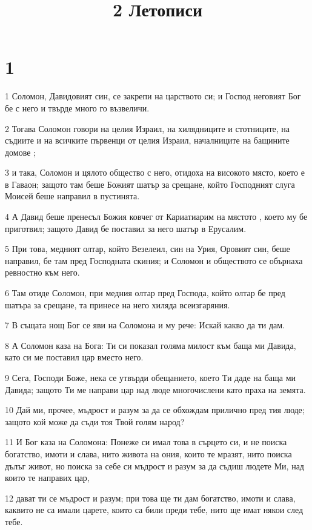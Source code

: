

\title{2 Летописи}


\chapter{1}

\par 1 Соломон, Давидовият син, се закрепи на царството си; и Господ неговият Бог бе с него и твърде много го възвеличи.
\par 2 Тогава Соломон говори на целия Израил, на хилядниците и стотниците, на съдиите и на всичките първенци от целия Израил, началниците на бащините домове ;
\par 3 и така, Соломон и цялото общество с него, отидоха на високото място, което е в Гаваон; защото там беше Божият шатър за срещане, който Господният слуга Моисей беше направил в пустинята.
\par 4 А Давид беше пренесъл Божия ковчег от Кариатиарим на мястото , което му бе приготвил; защото Давид бе поставил за него шатър в Ерусалим.
\par 5 При това, медният олтар, който Везелеил, син на Урия, Оровият син, беше направил, бе там пред Господната скиния; и Соломон и обществото се обърнаха ревностно към него.
\par 6 Там отиде Соломон, при медния олтар пред Господа, който олтар бе пред шатъра за срещане, та принесе на него хиляда всеизгаряния.
\par 7 В същата нощ Бог се яви на Соломона и му рече: Искай какво да ти дам.
\par 8 А Соломон каза на Бога: Ти си показал голяма милост към баща ми Давида, като си ме поставил цар вместо него.
\par 9 Сега, Господи Боже, нека се утвърди обещанието, което Ти даде на баща ми Давида; защото Ти ме направи цар над люде многочислени като праха на земята.
\par 10 Дай ми, прочее, мъдрост и разум за да се обхождам прилично пред тия люде; защото кой може да съди тоя Твой голям народ?
\par 11 И Бог каза на Соломона: Понеже си имал това в сърцето си, и не поиска богатство, имоти и слава, нито живота на ония, които те мразят, нито поиска дълъг живот, но поиска за себе си мъдрост и разум за да съдиш людете Ми, над които те направих цар,
\par 12 дават ти се мъдрост и разум; при това ще ти дам богатство, имоти и слава, каквито не са имали царете, които са били преди тебе, нито ще имат някои след тебе.
